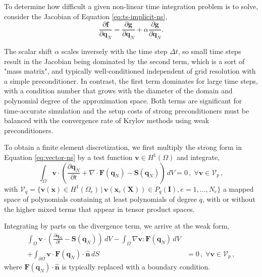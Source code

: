 To determine how difficult a given non-linear time integration problem is to solve, consider the Jacobian of Equation \ref{eq:ts-implicit-ns},
\begin{equation}
       \frac{\partial \mathbf f}{\partial \mathbf q_N}
       = \frac{\partial \mathbf g}{\partial \mathbf q_N}
       + \alpha \frac{\partial \mathbf g}{\partial \mathbf{\dot q}_N}.
\end{equation}

The scalar shift $\alpha$ scales inversely with the time step $\Delta t$, so small time steps result in the Jacobian being dominated by the second term, which is a sort of "mass matrix", and typically well-conditioned independent of grid resolution with a simple preconditioner.
In contrast, the first term dominates for large time steps, with a condition number that grows with the diameter of the domain and polynomial degree of the approximation space.
Both terms are significant for time-accurate simulation and the setup costs of strong preconditioners must be balanced with the convergence rate of Krylov methods using weak preconditioners.

To obtain a finite element discretization, we first multiply the strong form in Equation \ref{eq:vector-ns} by a test function $\mathbf v \in H^1 \left( \Omega \right)$ and integrate,
\begin{equation}
   \int_{\Omega} \mathbf v \cdot \left(\frac{\partial \mathbf{q}_N}{\partial t} + \nabla \cdot \mathbf{F}(\mathbf{q}_N) - \mathbf{S}(\mathbf{q}_N) \right) \,dV = 0 \, , \; \forall \mathbf v \in \mathcal{V}_p\,,
\end{equation}
with $\mathcal{V}_q = \{ \mathbf v(\mathbf x) \in H^{1} \left( \Omega_e \right) \,|\, \mathbf v(\mathbf x_e(\mathbf X)) \in P_q(\mathbf{I}), e = 1,\ldots,N_e \}$ a mapped space of polynomials containing at least polynomials of degree $q$, with or without the higher mixed terms that appear in tensor product spaces.

Integrating by parts on the divergence term, we arrive at the weak form,
\begin{equation}
   \begin{aligned}
   \int_{\Omega} \mathbf v \cdot \left( \frac{\partial \mathbf{q}_N}{\partial t} - \mathbf{S}(\mathbf{q}_N) \right)  \,dV
   - \int_{\Omega} \nabla \mathbf v \!:\! \mathbf{F}(\mathbf{q}_N)\,dV & \\
   + \int_{\partial \Omega} \mathbf v \cdot \mathbf{F}(\mathbf q_N) \cdot \hat{\mathbf{n}} \,dS
     &= 0 \, , \; \forall \mathbf v \in \mathcal{V}_p \,,
   \end{aligned}
   \label{eq:weak-vector-ns}
\end{equation}
where $\mathbf{F}(\mathbf q_N) \cdot \hat{\mathbf{n}}$ is typically replaced with a boundary condition.

